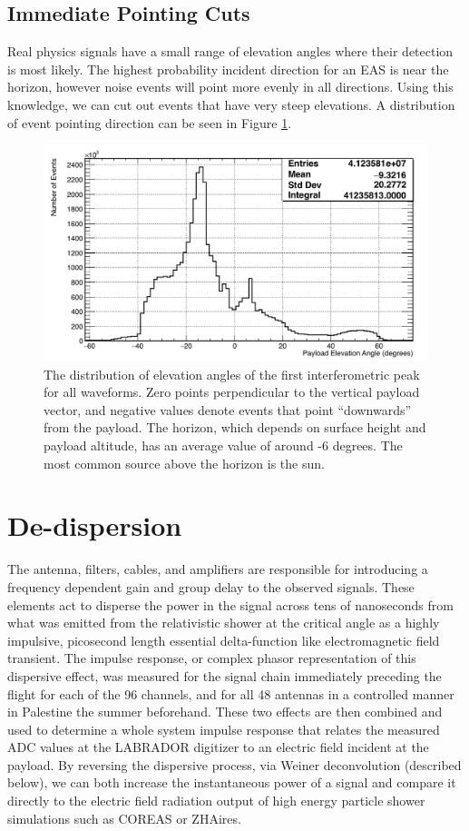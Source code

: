 	\subsection{Immediate Pointing Cuts}
		Real physics signals have a small range of elevation angles where their detection is most likely.  The highest probability incident direction for an EAS is near the horizon, however noise events will point more evenly in all directions.  Using this knowledge, we can cut out events that have very steep elevations.  A distribution of event pointing direction can be seen in Figure \ref{fig:elevationAngle}.

\begin{figure}
	\centering
	\includegraphics[width=\textwidth]{figures/elevationAngle}
	\caption{The distribution of elevation angles of the first interferometric peak for all waveforms.  Zero points perpendicular to the vertical payload vector, and negative values denote events that point ``downwards'' from the payload.  The horizon, which depends on surface height and payload altitude, has an average value of around -6 degrees.  The most common source above the horizon is the sun.} 
	\label{fig:elevationAngle}
\end{figure}	 
		


\section{De-dispersion}
	The antenna, filters, cables, and amplifiers are responsible for introducing a frequency dependent gain and group delay to the observed signals.  These elements act to disperse the power in the signal across tens of nanoseconds from what was emitted from the relativistic shower at the critical angle as a highly impulsive, picosecond length essential delta-function like electromagnetic field transient.  The impulse response, or complex phasor representation of this dispersive effect, was measured for the signal chain immediately preceding the flight for each of the 96 channels, and for all 48 antennas in a controlled manner in Palestine the summer beforehand.  These two effects are then combined and used to determine a whole system impulse response that relates the measured ADC values at the LABRADOR digitizer to an electric field incident at the payload.  By reversing the dispersive process, via Weiner deconvolution (described below), we can both increase the instantaneous power of a signal and compare it directly to the electric field radiation output of high energy particle shower simulations such as COREAS or ZHAires.
